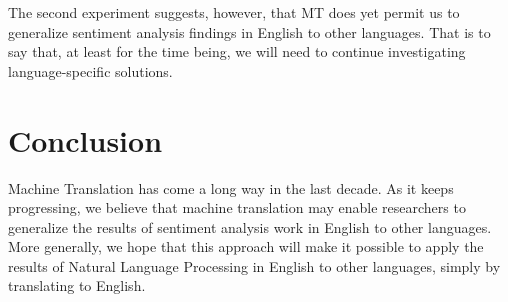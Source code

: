 \documentclass[11pt,a4paper]{article}
\begin{document}
    The second experiment suggests, however, that MT does yet permit us to generalize sentiment analysis findings in English to other languages. That is to say that, at least for the time being, we will need to continue investigating language-specific solutions.
    
\section{Conclusion}
    Machine Translation has come a long way in the last decade. As it keeps progressing, we believe that machine translation may enable researchers to generalize the results of sentiment analysis work in English to other languages. More generally, we hope that this approach will make it possible to apply the results of Natural Language Processing in English to other languages, simply by translating to English.
    



\end{document}
